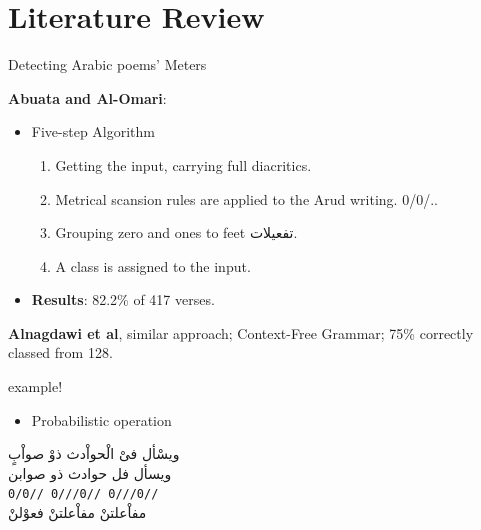 \documentclass[10pt]{beamer}
\begin{document}
\section{Literature Review}
\begin{frame}[fragile]{Detecting Arabic poems' Meters}

\textbf{Abuata and Al-Omari}:
    \begin{itemize}
        \item Five-step Algorithm
            \begin{enumerate}
                \item Getting the input, carrying full diacritics.
                \item Metrical scansion rules are applied to the Arud writing. 0/0/..
                \item Grouping zero and ones to feet \textarabic{تفعيلات}.
                \item A class is assigned  to the input.
            \end{enumerate}
        \item \textbf{\alert{Results}}: 82.2\% of 417 verses.
    \end{itemize}
\textbf{Alnagdawi et al}, similar approach;  Context-Free Grammar; 75\% correctly
classed from 128.
\end{frame}

\begin{frame}[fragile]{example!}

\begin{itemize}
    \item Probabilistic operation 
\end{itemize}

\begin{center}
  \textarabic{ويسْأل فىْ الْحواْدث ذوْ صواْبٍ}\\
  \textarabic{ويسأل فل \hspace{0.4cm}
    حوادث ذو\hspace{0.4cm}
    صوابن}\\
  \texttt{0/0//     \hspace{0.3cm}
          0///0//   \hspace{0.3cm}
          0///0//}\\

  \textarabic{مفاْعلتنْ\hspace{0.7cm} 
    مفاْعلتنْ          \hspace{0.7cm}
    فعوْلنْ}
\end{center}

\end{frame}
\end{document}
